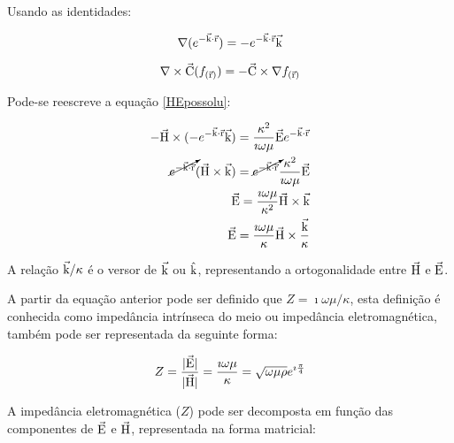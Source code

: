         \noindent Usando as identidades:
        
        \begin{equation}
            \nabla (e^{-\vec{\textrm{k}} \cdot \vec{\textrm{r}}}) = - e^{-\vec{\textrm{k}} \cdot \vec{\textrm{r}}} \vec{\textrm{k}}
        \end{equation}

        \begin{equation}
            \nabla \times \vec{\textrm{C}}(f_{(\vec{\textrm{r}})}) = - \vec{\textrm{C}} \times \nabla f_{(\vec{\textrm{r}})} 
        \end{equation}
        
        Pode-se reescreve a equação \ref{HEpossolu}:
        
        {\setlength\arraycolsep{2pt}
        \begin{eqnarray}
            \label{EZHvetor}
            - \vec{\textrm{H}} \times (- e^{-\vec{\textrm{k}} \cdot \vec{\textrm{r}}} \vec{\textrm{k}}) = \dfrac{\kappa^2}{\imath \omega \mu} \vec{\textrm{E}}e^{-\vec{\textrm{k}} \cdot \vec{\textrm{r}}} \nonumber \\
            \cancelto{}{e^{-\vec{\textrm{k}} \cdot \vec{\textrm{r}}}} (\vec{\textrm{H}} \times \vec{\textrm{k}}) = \cancelto{}{e^{-\vec{\textrm{k}} \cdot \vec{\textrm{r}}}} \dfrac{\kappa^2}{\imath \omega \mu} \vec{\textrm{E}}\nonumber \\
            \vec{\textrm{E}} = \dfrac{\imath \omega \mu}{\kappa^2} \vec{\textrm{H}} \times \vec{\textrm{k}} \nonumber \\
            \vec{\textrm{E}} = \dfrac{\imath \omega \mu}{\kappa} \vec{\textrm{H}} \times \dfrac{\vec{\textrm{k}}}{\kappa}
        \end{eqnarray}} 
        
        \noindent A relação $\vec{\textrm{k}}/\kappa$ é o versor de $\vec{\textrm{k}}$ ou  $\hat{\textrm{k}}$, representando a ortogonalidade entre $\vec{\textrm{H}}$ e $\vec{\textrm{E}}$.
        
        A partir da equação anterior pode ser definido que $Z = \imath \omega \mu / \kappa$, esta definição é conhecida como impedância intrínseca do meio ou impedância eletromagnética, também pode ser representada da seguinte forma:
        
        \begin{equation}
            Z = \dfrac{|\vec{\textrm{E}}|}{|\vec{\textrm{H}}|} = \dfrac{\imath \omega \mu}{\kappa} = \sqrt{\omega \mu \rho} e^{\imath \frac{\pi}{4}}
        \end{equation}
        
        A impedância eletromagnética ($Z$) pode ser decomposta em função das componentes de $\vec{\textrm{E}}$ e $\vec{\textrm{H}}$, representada na forma matricial:
        
